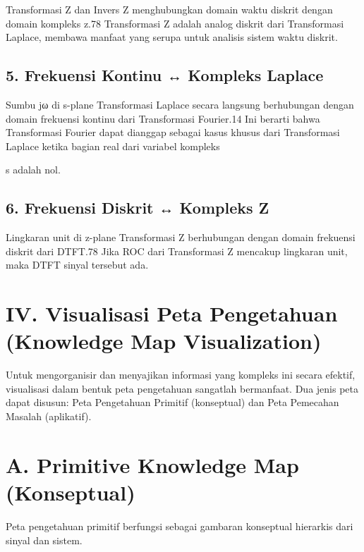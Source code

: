 \documentclass[
  letterpaper,
  DIV=11,
  numbers=noendperiod]{scrreprt}
\begin{document}
Transformasi Z dan Invers Z menghubungkan domain waktu diskrit dengan
domain kompleks z.78 Transformasi Z adalah analog diskrit dari
Transformasi Laplace, membawa manfaat yang serupa untuk analisis sistem
waktu diskrit.

\subsection{5. Frekuensi Kontinu ↔ Kompleks
Laplace}\label{frekuensi-kontinu-kompleks-laplace}

Sumbu jω di s-plane Transformasi Laplace secara langsung berhubungan
dengan domain frekuensi kontinu dari Transformasi Fourier.14 Ini berarti
bahwa Transformasi Fourier dapat dianggap sebagai kasus khusus dari
Transformasi Laplace ketika bagian real dari variabel kompleks

s adalah nol.

\subsection{6. Frekuensi Diskrit ↔ Kompleks
Z}\label{frekuensi-diskrit-kompleks-z}

Lingkaran unit di z-plane Transformasi Z berhubungan dengan domain
frekuensi diskrit dari DTFT.78 Jika ROC dari Transformasi Z mencakup
lingkaran unit, maka DTFT sinyal tersebut ada.

\section{IV. Visualisasi Peta Pengetahuan (Knowledge Map
Visualization)}\label{iv.-visualisasi-peta-pengetahuan-knowledge-map-visualization}

Untuk mengorganisir dan menyajikan informasi yang kompleks ini secara
efektif, visualisasi dalam bentuk peta pengetahuan sangatlah bermanfaat.
Dua jenis peta dapat disusun: Peta Pengetahuan Primitif (konseptual) dan
Peta Pemecahan Masalah (aplikatif).

\section{A. Primitive Knowledge Map
(Konseptual)}\label{a.-primitive-knowledge-map-konseptual}

Peta pengetahuan primitif berfungsi sebagai gambaran konseptual
hierarkis dari sinyal dan sistem.
\end{document}
